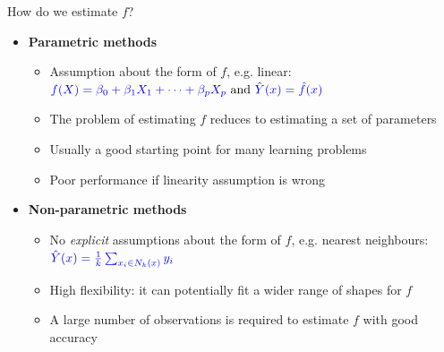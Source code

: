 \documentclass[14pt]{beamer}
\begin{document}
\begin{frame}{How do we estimate $f$?}

\begin{itemize}
	\item \textbf{Parametric methods}
		\begin{itemize}
		\item Assumption about the form of $f$, e.g. linear: $\textcolor{blue}{f(X) = \beta_0 + \beta_1 X_1 + \dots + \beta_p X_p} \text{~and~} \textcolor{blue}{\hat Y(x) = \hat f(x)} $
		\item[\textcolor{darkgreen}{\smiley}] The problem of estimating $f$ reduces to estimating a set of parameters
		\item[\textcolor{darkgreen}{\smiley}] Usually a good starting point for many learning problems
		\item [\textcolor{red}{\frownie}] Poor performance if linearity assumption is wrong
		\end{itemize}
	\item \textbf{Non-parametric methods}
		\begin{itemize}
		\item No \emph{explicit} assumptions about the  form of $f$, e.g. nearest neighbours: $\textcolor{blue}{\hat Y(x) = \frac1k \sum_{x_i \in N_k(x)} y_i}$
		\item[\textcolor{darkgreen}{\smiley}] High flexibility: it can potentially fit a wider range of shapes for $f$
		\item [\textcolor{red}{\frownie}] A large number of observations is required to estimate $f$ with good accuracy
		\end{itemize}
\end{itemize}

\end{frame}
\end{document}
